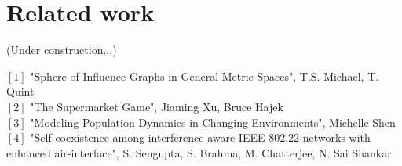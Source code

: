 \documentclass[10pt]{article}
\theoremstyle{definition}
\begin{document}
\section{Related work}

(Under construction...)

$[1]$ "Sphere of Influence Graphs in General Metric Spaces", T.S. Michael, T. Quint\\
$[2]$ "The Supermarket Game", Jiaming Xu, Bruce Hajek\\
$[3]$ "Modeling Population Dynamics in Changing Environments", Michelle Shen\\
$[4]$ "Self-coexistence among interference-aware IEEE 802.22 networks with enhanced air-interface", S. Sengupta, S. Brahma, M. Chatterjee, N. Sai Shankar\\
\end{document}
